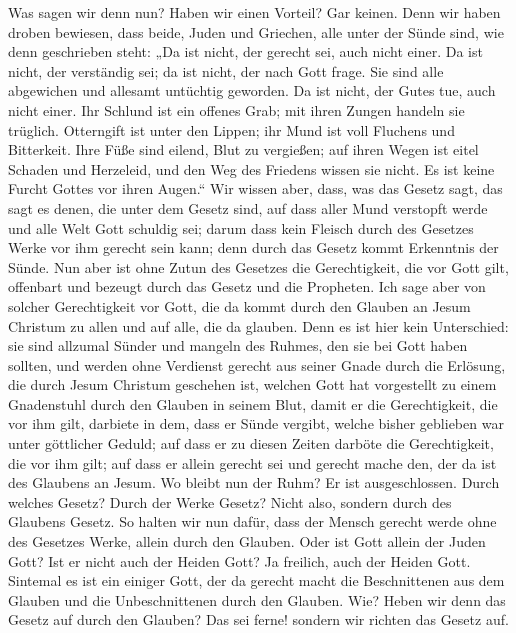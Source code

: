  Was sagen wir denn nun? Haben wir einen Vorteil? Gar
keinen. Denn wir haben droben bewiesen, dass beide, Juden und Griechen,
alle unter der Sünde sind,  wie denn geschrieben steht:
„Da ist nicht, der gerecht sei, auch nicht einer.  Da ist
nicht, der verständig sei; da ist nicht, der nach Gott frage.
 Sie sind alle abgewichen und allesamt untüchtig
geworden. Da ist nicht, der Gutes tue, auch nicht einer. 
Ihr Schlund ist ein offenes Grab; mit ihren Zungen handeln sie trüglich.
Otterngift ist unter den Lippen;  ihr Mund ist voll
Fluchens und Bitterkeit.  Ihre Füße sind eilend, Blut zu
vergießen;  auf ihren Wegen ist eitel Schaden und
Herzeleid,  und den Weg des Friedens wissen sie nicht.
 Es ist keine Furcht Gottes vor ihren Augen.``
 Wir wissen aber, dass, was das Gesetz sagt, das sagt es
denen, die unter dem Gesetz sind, auf dass aller Mund verstopft werde
und alle Welt Gott schuldig sei;  darum dass kein Fleisch
durch des Gesetzes Werke vor ihm gerecht sein kann; denn durch das
Gesetz kommt Erkenntnis der Sünde.  Nun aber ist ohne
Zutun des Gesetzes die Gerechtigkeit, die vor Gott gilt, offenbart und
bezeugt durch das Gesetz und die Propheten.  Ich sage
aber von solcher Gerechtigkeit vor Gott, die da kommt durch den Glauben
an Jesum Christum zu allen und auf alle, die da glauben. 
Denn es ist hier kein Unterschied: sie sind allzumal Sünder und mangeln
des Ruhmes, den sie bei Gott haben sollten,  und werden
ohne Verdienst gerecht aus seiner Gnade durch die Erlösung, die durch
Jesum Christum geschehen ist,  welchen Gott hat
vorgestellt zu einem Gnadenstuhl durch den Glauben in seinem Blut, damit
er die Gerechtigkeit, die vor ihm gilt, darbiete in dem, dass er Sünde
vergibt, welche bisher geblieben war unter göttlicher Geduld;
 auf dass er zu diesen Zeiten darböte die Gerechtigkeit,
die vor ihm gilt; auf dass er allein gerecht sei und gerecht mache den,
der da ist des Glaubens an Jesum.  Wo bleibt nun der
Ruhm? Er ist ausgeschlossen. Durch welches Gesetz? Durch der Werke
Gesetz? Nicht also, sondern durch des Glaubens Gesetz. 
So halten wir nun dafür, dass der Mensch gerecht werde ohne des Gesetzes
Werke, allein durch den Glauben.  Oder ist Gott allein
der Juden Gott? Ist er nicht auch der Heiden Gott? Ja freilich, auch der
Heiden Gott.  Sintemal es ist ein einiger Gott, der da
gerecht macht die Beschnittenen aus dem Glauben und die Unbeschnittenen
durch den Glauben.  Wie? Heben wir denn das Gesetz auf
durch den Glauben? Das sei ferne! sondern wir richten das Gesetz auf.

